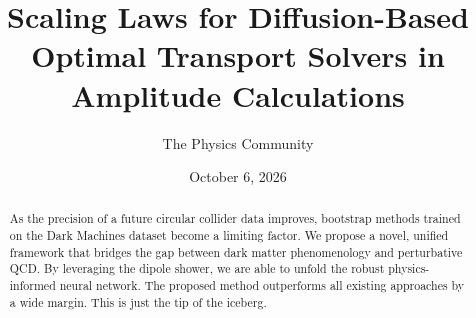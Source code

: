 \documentclass[11pt]{article}
\title{Scaling Laws for Diffusion-Based Optimal Transport Solvers in Amplitude Calculations}
\author{The Physics Community}
\date{October 6, 2026}
\begin{document}
\maketitle
\begin{abstract}
As the precision of a future circular collider data improves, bootstrap
methods trained on the Dark Machines dataset become a limiting factor.
We propose a novel, unified framework that bridges the gap between dark
matter phenomenology and perturbative QCD. By leveraging the dipole
shower, we are able to unfold the robust physics-informed neural
network. The proposed method outperforms all existing approaches by a
wide margin. This is just the tip of the iceberg.
\end{abstract}
\tableofcontents






\nocite{*}


\end{document}
